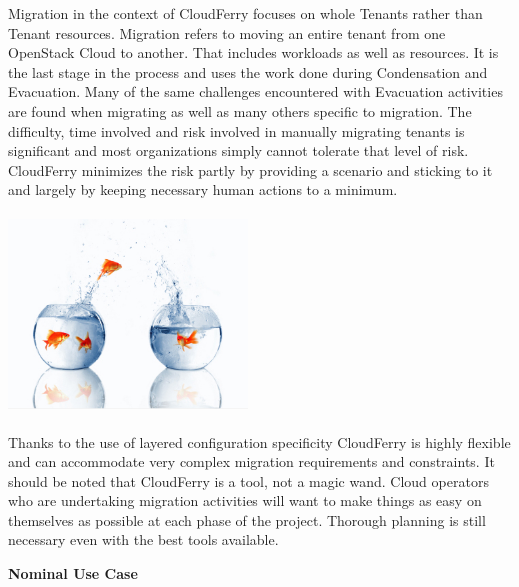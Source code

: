 \documentclass{article}
\begin{document}
\vspace{2pt}
\baselineskip=12pt

{\color{color03} Migration in the context of CloudFerry focuses on whole Tenants 
rather than Tenant resources. Migration refers to moving an entire tenant from 
one OpenStack Cloud to another. That includes workloads as well as resources. It 
is the last stage in the process and uses the work done during Condensation and 
Evacuation. Many of the same challenges encountered with Evacuation activities 
are found when migrating as well as many others specific to migration. The difficulty, 
time involved and risk involved in manually migrating tenants is significant and 
most organizations simply cannot tolerate that level of risk. CloudFerry minimizes 
the risk partly by providing a scenario and sticking to it and largely by keeping 
necessary human actions to a minimum.}

\begin{center}
\includegraphics[width=180pt, height=150pt, keepaspectratio=true]{images/CloudFerry_Brochure-fig007.png}

\end{center}

\vspace{24pt}
\baselineskip=12pt

{\color{color03} Thanks to the use of layered configuration specificity CloudFerry 
is highly flexible and can accommodate very complex migration requirements and 
constraints. It should be noted that CloudFerry is a tool, not a magic wand. Cloud 
operators who are undertaking migration activities will want to make things as 
easy on themselves as possible at each phase of the project. Thorough planning 
is still necessary even with the best tools available.}

\vspace{30pt}
{\large{}{\color{color03} \textbf{Nominal Use Case}}}
\end{document}
